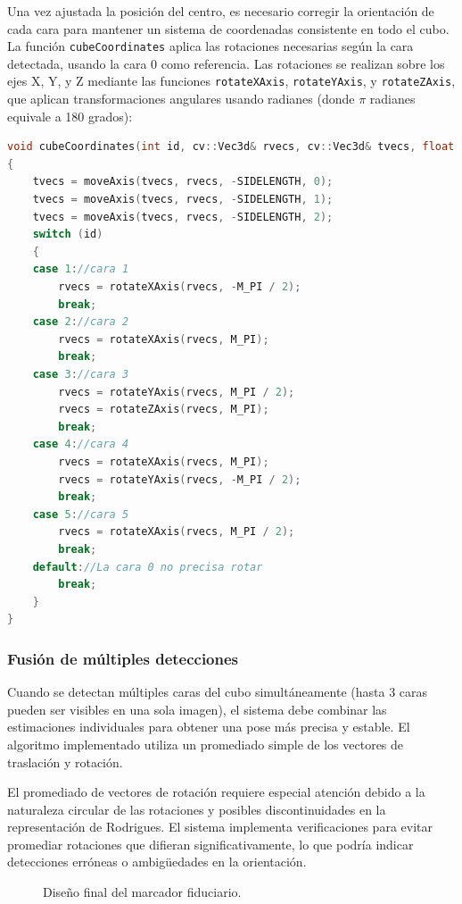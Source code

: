 Una vez ajustada la posición del centro, es necesario corregir la orientación de cada cara para mantener un sistema de coordenadas consistente en todo el cubo. La función \texttt{cubeCoordinates} aplica las rotaciones necesarias según la cara detectada, usando la cara 0 como referencia. Las rotaciones se realizan sobre los ejes X, Y, y Z mediante las funciones \texttt{rotateXAxis}, \texttt{rotateYAxis}, y \texttt{rotateZAxis}, que aplican transformaciones angulares usando radianes (donde $\pi$ radianes equivale a 180 grados):
\begin{lstlisting}[language=C++]
void cubeCoordinates(int id, cv::Vec3d& rvecs, cv::Vec3d& tvecs, float sideLength)
{
    tvecs = moveAxis(tvecs, rvecs, -SIDELENGTH, 0);
    tvecs = moveAxis(tvecs, rvecs, -SIDELENGTH, 1);
    tvecs = moveAxis(tvecs, rvecs, -SIDELENGTH, 2);
    switch (id)
    {
    case 1://cara 1
        rvecs = rotateXAxis(rvecs, -M_PI / 2);
        break;
    case 2://cara 2
        rvecs = rotateXAxis(rvecs, M_PI);
        break;
    case 3://cara 3
        rvecs = rotateYAxis(rvecs, M_PI / 2);
        rvecs = rotateZAxis(rvecs, M_PI);
        break;
    case 4://cara 4
        rvecs = rotateXAxis(rvecs, M_PI);
        rvecs = rotateYAxis(rvecs, -M_PI / 2);
        break;
    case 5://cara 5
        rvecs = rotateXAxis(rvecs, M_PI / 2);
        break;
    default://La cara 0 no precisa rotar
        break;
    }
}
\end{lstlisting}

\subsubsection{Fusión de múltiples detecciones}
Cuando se detectan múltiples caras del cubo simultáneamente (hasta 3 caras pueden ser visibles en una sola imagen), el sistema debe combinar las estimaciones individuales para obtener una pose más precisa y estable. El algoritmo implementado utiliza un promediado simple de los vectores de traslación y rotación.

El promediado de vectores de rotación requiere especial atención debido a la naturaleza circular de las rotaciones y posibles discontinuidades en la representación de Rodrigues. El sistema implementa verificaciones para evitar promediar rotaciones que difieran significativamente, lo que podría indicar detecciones erróneas o ambigüedades en la orientación.


\begin{figure}%
	\centering
	\qquad
	\caption{Diseño final del marcador fiduciario.}%
	\label{fig:cubo_marker}%
\end{figure}

